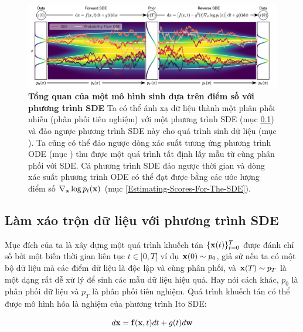 \documentclass{article} %
\begin{document}
\begin{figure}[h!]
    \centering
    \includegraphics[width=\textwidth]{2.png}
    \caption{\textbf{Tổng quan của một mô hình sinh dựa trên điểm số với phương trình SDE}
    Ta có thể ánh xạ dữ liệu thành một phân phối nhiễu (phân phối tiên nghiệm) với một phương trình SDE (mục \ref{Pertubring-data-with-SDE}) và đảo ngược phương trình SDE này cho quá trình sinh dữ liệu (mục ).
    Ta cũng có thể đảo ngược dòng xác suất tương ứng phương trình ODE (mục ) thu được một quá trình tất định lấy mẫu từ cùng phân phối với SDE.
    Cả phương trình SDE đảo ngược thời gian và dòng xác suất phương trình ODE có thể đạt được bằng các ước lượng điểm số $\nabla_{\bold{x}} \log p_t (\bold{x})$ (mục \ref{Estimating-Scores-For-The-SDE}).}
    \label{fig:2}
\end{figure}

\subsection{Làm xáo trộn dữ liệu với phương trình SDE} \label{Pertubring-data-with-SDE}

Mục đích của ta là xây dựng một quá trình khuếch tán $\lbrace \bold{x}(t) \rbrace_{t=0}^T$ được đánh chỉ số bởi một biến thời gian liên tục $t \in \lbrack 0, T \rbrack$ ví dụ $\bold{x}(0) \sim p_0$, giả sử nếu ta có một bộ dữ liệu mà các điểm dữ liệu là độc lập và cùng phân phối, và $\bold{x}(T) \sim p_T$ là một dạng rất dễ xử lý để sinh các mẫu dữ liệu hiệu quả.
Hay nói cách khác, $p_0$ là phân phối dữ liệu và $p_T$ là phân phối tiên nghiệm.
Quá trình khuếch tán có thể được mô hình hóa là nghiệm của phương trình Ito SDE:

\begin{equation} \label{eq:5}
    d \bold{x} = \bold{f} (\bold{x}, t) dt + g(t) d \bold{w}
\end{equation}
\end{document}
